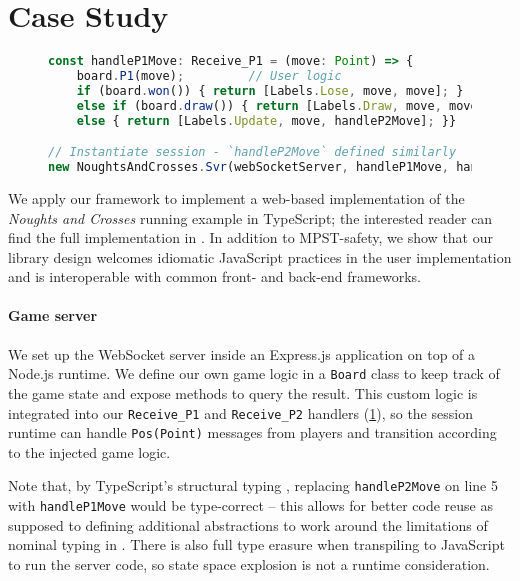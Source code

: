 \section{Case Study}
\label{section:example}

\begin{figure}
\begin{lstlisting}[language=JavaScript, tabsize=4]
const handleP1Move: Receive_P1 = (move: Point) => {
	board.P1(move);			// User logic
	if (board.won()) { return [Labels.Lose, move, move]; }
	else if (board.draw()) { return [Labels.Draw, move, move]; }
	else { return [Labels.Update, move, handleP2Move]; }}

// Instantiate session - `handleP2Move` defined similarly
new NoughtsAndCrosses.Svr(webSocketServer, handleP1Move, handleP2Move);
\end{lstlisting}
\label{lst:svrprotocol}
\end{figure}

We apply our framework to implement a web-based implementation of the
\textit{Noughts and Crosses} running example in TypeScript;
the interested reader can find the full implementation in
\cite{NoughtsAndCrosses}.
In addition to MPST-safety, we show that our library design welcomes idiomatic
JavaScript practices in the user implementation and is interoperable with
common front- and back-end frameworks.

\paragraph{Game server}
We set up the WebSocket server inside an Express.js \cite{ExpressJS}
application on top of a Node.js \cite{NodeJS} runtime.
We define our own game logic in a \texttt{Board} class to keep track of the
game state and expose methods to query the result.
This custom logic is integrated into our \texttt{Receive\_P1} and
\texttt{Receive\_P2} handlers (\cref{lst:svrprotocol}), so the session runtime
can handle \texttt{Pos(Point)} messages from players and transition according
to the injected game logic.

Note that, by TypeScript's structural typing \cite{TypeScriptSpec}, replacing
\texttt{handleP2Move} on line 5 with \texttt{handleP1Move} would be
type-correct -- this allows for better code reuse as supposed to defining
additional abstractions to work around the limitations of nominal typing in
\cite{Hybrid2016}.
There is also full type erasure when transpiling to JavaScript to run the
server code, so state space explosion is not a runtime consideration.

